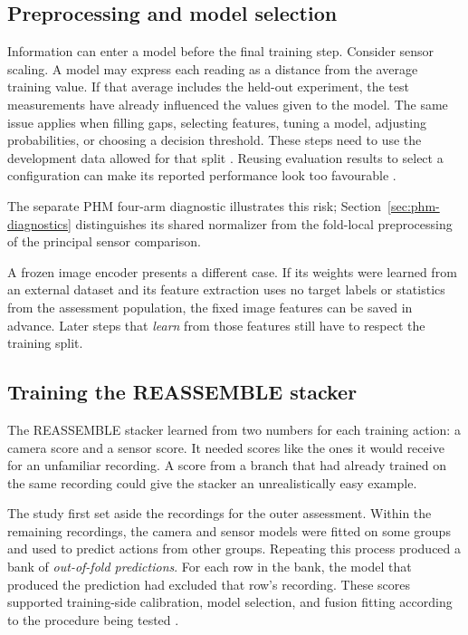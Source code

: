 \subsection{Preprocessing and model selection}

Information can enter a model before the final training step. Consider sensor scaling. A
model may express each reading as a distance from the average training value. If that
average includes the held-out experiment, the test measurements have already influenced
the values given to the model. The same issue applies when filling gaps, selecting
features, tuning a model, adjusting probabilities, or choosing a decision threshold.
These steps need to use the development data allowed for that split \parencite{P017}.
Reusing evaluation results to select a configuration can make its reported performance
look too favourable \parencite{P004}.

The separate PHM four-arm diagnostic illustrates this risk;
Section~\ref{sec:phm-diagnostics} distinguishes its shared normalizer from the
fold-local preprocessing of the principal sensor comparison.

A frozen image encoder presents a different case. If its weights were learned from an
external dataset and its feature extraction uses no target labels or statistics from the
assessment population, the fixed image features can be saved in advance. Later steps
that \emph{learn} from those features still have to respect the training split.

\subsection{Training the REASSEMBLE stacker}

The REASSEMBLE stacker learned from two numbers for each training action: a camera score
and a sensor score. It needed scores like the ones it would receive for an unfamiliar
recording. A score from a branch that had already trained on the same recording could
give the stacker an unrealistically easy example.

The study first set aside the recordings for the outer assessment. Within the remaining
recordings, the camera and sensor models were fitted on some groups and used to predict
actions from other groups. Repeating this process produced a bank of \emph{out-of-fold
predictions}. For each row in the bank, the model that produced the prediction had
excluded that row’s recording. These scores supported training-side calibration, model
selection, and fusion fitting according to the procedure being tested
\parencite{Ting1999Issues}.

